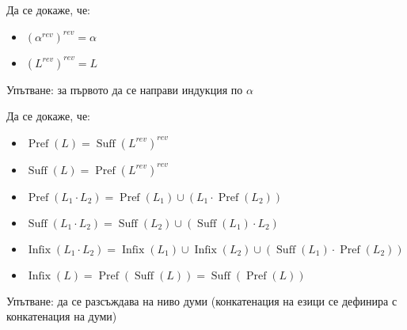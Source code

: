 \begin{problem}
Да се докаже, че:
\begin{itemize}
    \item $(\alpha^{rev})^{rev} = \alpha$
    \item $(L^{rev})^{rev} = L$
\end{itemize}

Упътване: за първото да се направи индукция по $\alpha$
\end{problem}
\begin{problem}
Да се докаже, че:
\begin{itemize}
    \item $\operatorname{Pref}(L) = \operatorname{Suff}(L^{rev})^{rev}$
    \item $\operatorname{Suff}(L) = \operatorname{Pref}(L^{rev})^{rev}$
    \item $\operatorname{Pref}(L_1 \cdot L_2) = \operatorname{Pref}(L_1) \cup (L_1 \cdot \operatorname{Pref}(L_2))$
    \item $\operatorname{Suff}(L_1 \cdot L_2) = \operatorname{Suff}(L_2) \cup (\operatorname{Suff}(L_1) \cdot L_2)$
    \item $\operatorname{Infix}(L_1 \cdot L_2) = \operatorname{Infix}(L_1) \cup \operatorname{Infix}(L_2) \cup (\operatorname{Suff}(L_1) \cdot \operatorname{Pref}(L_2))$
    \item $\operatorname{Infix}(L) = \operatorname{Pref}(\operatorname{Suff}(L)) = \operatorname{Suff}(\operatorname{Pref}(L))$
\end{itemize}

Упътване: да се разсъждава на ниво думи (конкатенация на езици се дефинира с конкатенация на думи)
\end{problem}